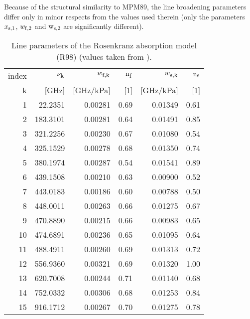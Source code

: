 {Because of the structural similarity to MPM89, the line broadening 
parameters differ only in minor respects from the values used therein 
(only the parameters $x_{\rm s,1}$, $w_{\rm f,2}$ and $\rm w_{\rm s,2}$ 
are significantly different).
%
\begin{table}[!htb]
\begin{center}
\begin{tabular}{rrrrrr}
 \hline
 index &  $\nu_{\mbox{\rm \small k}}$      & $w_{\mbox{\rm \small f,k}}$     & ${\rm n}_{\mbox{\rm \small f}}$ & $w_{\mbox{\rm \small s,k}}$     & ${\rm n}_{\mbox{\rm \small s}}$ \\
   k   &  [GHz]       & [GHz/kPa] & [1]   & [GHz/kPa] & [1] \\ 
 \hline
   1   &   22.2351    & 0.00281   & 0.69  & 0.01349   &  0.61 \\
   2   &  183.3101    & 0.00281   & 0.64  & 0.01491   &  0.85 \\
   3   &  321.2256    & 0.00230   & 0.67  & 0.01080   &  0.54 \\
  4    &  325.1529    & 0.00278   & 0.68  & 0.01350   &  0.74 \\
  5    &  380.1974    & 0.00287   & 0.54  & 0.01541   &  0.89 \\
  6    &  439.1508    & 0.00210   & 0.63  & 0.00900   &  0.52 \\
  7    &  443.0183    & 0.00186   & 0.60  & 0.00788   &  0.50 \\
  8    &  448.0011    & 0.00263   & 0.66  & 0.01275   &  0.67 \\
  9    &  470.8890    & 0.00215   & 0.66  & 0.00983   &  0.65 \\
  10   &  474.6891    & 0.00236   & 0.65  & 0.01095   &  0.64 \\
  11   &  488.4911    & 0.00260   & 0.69  & 0.01313   &  0.72 \\
  12   &  556.9360    & 0.00321   & 0.69  & 0.01320   &  1.00 \\
  13   &  620.7008    & 0.00244   & 0.71  & 0.01140   &  0.68 \\
  14   &  752.0332    & 0.00306   & 0.68  & 0.01253   &  0.84 \\
  15   &  916.1712    & 0.00267   & 0.70  & 0.01275   &  0.78 \\
  \hline
\end{tabular}
\end{center}
  \caption{Line parameters of the Rosenkranz absorption model (R98) 
  (values taken from \citet{pwr:98}).}
\label{tab:pwr98linelist}
\end{table}



}
